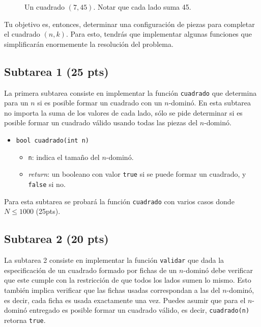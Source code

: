 \documentclass{oci}
\begin{document}
\begin{figure}[ht]
 \centering
 
 \caption{Un cuadrado $(7,45)$. Notar que cada lado suma 45.}
 \label{f:cuadrado7}
\end{figure}

Tu objetivo es, entonces, determinar una configuración de piezas para completar el cuadrado $(n,k)$.
Para esto, tendrás que implementar algunas funciones que simplificarán enormemente la resolución del problema.



\subsection*{Subtarea 1 (25 pts)}
La primera subtarea consiste en implementar la función \verb+cuadrado+ que determina para un $n$ si es posible formar un cuadrado con un $n$-dominó.
En esta subtarea no importa la suma de los valores de cada lado, sólo se pide determinar si es posible formar un cuadrado válido usando todas las piezas del $n$-dominó.

\begin{itemize}
 \item \verb+bool cuadrado(int n)+
 \begin{itemize}
  \item \verb+n+: indica el tamaño del $n$-dominó.
  \item \emph{return}: un booleano con valor \verb+true+ si se puede formar un cuadrado, y \verb+false+ si no.
 \end{itemize}
\end{itemize}

Para esta subtarea se probará la función \verb+cuadrado+ con varios casos donde $N\leq 1000$ (25pts).

\subsection*{Subtarea 2 (20 pts)}
La subtarea 2 consiste en implementar la función \verb+validar+ que dada la especificación de un cuadrado formado por fichas de un $n$-dominó debe verificar que este cumple con la restricción de que todos los lados sumen lo mismo.
Esto también implica verificar que las fichas usadas correspondan a las del $n$-dominó, es decir, cada ficha es usada exactamente una vez.
Puedes asumir que para el $n$-dominó entregado es posible formar un cuadrado válido, es decir, \verb+cuadrado(n)+ retorna \verb+true+.
\end{document}
